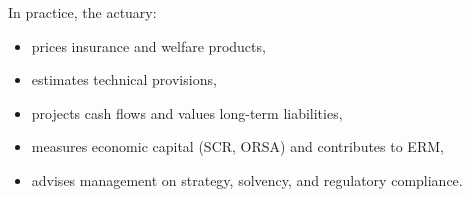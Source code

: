 \begin{f}[Actuary]
	
	In practice, the actuary:
	\begin{itemize}[nosep]
		\item prices insurance and welfare products,
		\item estimates technical provisions,
		\item projects cash flows and values long-term liabilities,
		\item measures economic capital (SCR, ORSA) and contributes to ERM,
		\item advises management on strategy, solvency, and regulatory compliance.
	\end{itemize}
	
\end{f}